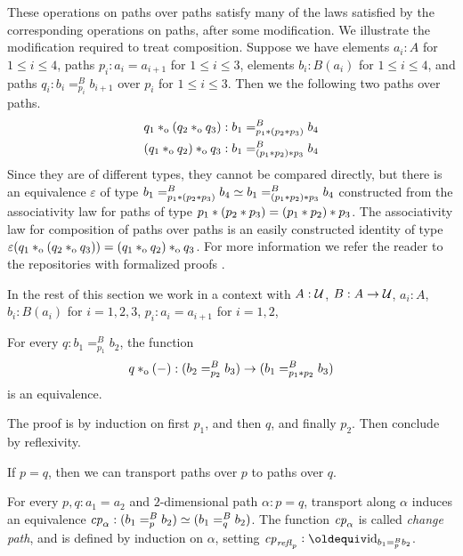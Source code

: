 \documentclass[a4,12pt]{amsart}
\begin{document}
These operations on paths over paths satisfy many of the laws satisfied by the corresponding operations on paths, after some modification.  We
illustrate the modification required to treat composition.  Suppose we have elements $a_i : A$ for $1 \le i \le 4$, paths $p_i : a_i = a_{i+1}$
for $1 \le i \le 3$, elements $b_i:B(a_i)$ for $1 \le i \le 4$, and paths $q_i : b_i =^B_{p_i} b_{i+1}$ over $p_i$ for $1 \le i \le 3$.
Then we the following two paths over paths.
\begin{align*}
   q_1 *_{\mathrm{o}} (q_2 *_{\mathrm{o}} q_3) & : b_1 =^B_{p_1* (p_2* p_3)} b_4 \\
  (q_1 *_{\mathrm{o}} q_2) *_{\mathrm{o}} q_3  & : b_1 =^B_{(p_1* p_2) * p_3} b_4
\end{align*}
Since they are of different types, they cannot be compared directly, but there is an
equivalence $\varepsilon$ of type $b_1 =^B_{p_1* (p_2* p_3)} b_4 \simeq b_1 =^B_{(p_1* p_2) * p_3} b_4$
constructed from the associativity law for paths of type $p_1*(p_2* p_3) = (p_1* p_2)* p_3$.
The associativity law for composition of paths over paths is an easily constructed identity of type $\varepsilon(q_1 *_{\mathrm{o}} (q_2 *_{\mathrm{o}} q_3)) = (q_1 *_{\mathrm{o}} q_2)*_{\mathrm{o}} q_3$.
For more information we refer the reader to the repositories with formalized proofs \cite{circleind-Dan}. 

In the rest of this section we work in a context with
$A : \mathcal{U}$, $B : A \to \mathcal{U}$, $a_i:A$, $b_i:B(a_i)$ for $i=1,2,3$, 
$p_i : a_i = a_{i+1}$ for $i=1,2$,

\begin{lemma}\label{lem:compo-over}
  For every $q : b_1 =^B_{p_1} b_2$, the
  function
  \[
    q *_{\mathrm{o}} ({-}) : (b_2 =^B_{p_2} b_3) \to (b_1 =^B_{p_1* p_2} b_3)
  \]
  is an equivalence.
\end{lemma}
The proof is by induction on first $p_1$, and then $q$, and finally $p_2$.
Then conclude by reflexivity.

If $p=q$, then we can transport paths over $p$ to paths over $q$.

\begin{definition}\label{def:pathover-change-path}
  For every $p,q:a_1=a_2$ and $2$-dimensional path $\alpha : p = q$,
  transport along $\alpha$
  induces an equivalence $\mathit{cp}_{\alpha}: (b_1 =^B_p b_2) \simeq (b_1 =^B_q b_2)$.
  The function $\mathit{cp}_{\alpha}$ is called \emph{change path}, and is defined
  by induction on $\alpha$, setting $\cp{\refl{p}}\defeq \id_{b_1 =^B_p b_2}$.
\end{definition}
\end{document}
